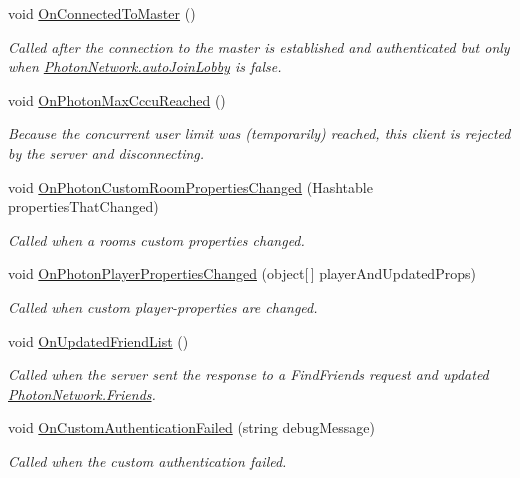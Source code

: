 \begin{DoxyCompactItemize}
void \hyperlink{interface_i_pun_callbacks_aee4c7c26520ae45019b605b054fa1ac0}{On\+Connected\+To\+Master} ()
\begin{DoxyCompactList}\small\item\em Called after the connection to the master is established and authenticated but only when \hyperlink{class_photon_network_ad534d4da7222bd8a6d8423cbd238d7f4}{Photon\+Network.\+auto\+Join\+Lobby} is false. \end{DoxyCompactList}\item 
void \hyperlink{interface_i_pun_callbacks_a445d24c62e4e3d8bbc2cc0d25853d43c}{On\+Photon\+Max\+Cccu\+Reached} ()
\begin{DoxyCompactList}\small\item\em Because the concurrent user limit was (temporarily) reached, this client is rejected by the server and disconnecting. \end{DoxyCompactList}\item 
void \hyperlink{interface_i_pun_callbacks_a3a210383eb25f1c6f509aaa23c792f6f}{On\+Photon\+Custom\+Room\+Properties\+Changed} (Hashtable properties\+That\+Changed)
\begin{DoxyCompactList}\small\item\em Called when a room\textquotesingle{}s custom properties changed. \end{DoxyCompactList}\item 
void \hyperlink{interface_i_pun_callbacks_aa6d84e9c68f93825fb3bf453d6f5ca1b}{On\+Photon\+Player\+Properties\+Changed} (object\mbox{[}$\,$\mbox{]} player\+And\+Updated\+Props)
\begin{DoxyCompactList}\small\item\em Called when custom player-\/properties are changed. \end{DoxyCompactList}\item 
void \hyperlink{interface_i_pun_callbacks_a5dd5d351e76698a0b6665064f6282baa}{On\+Updated\+Friend\+List} ()
\begin{DoxyCompactList}\small\item\em Called when the server sent the response to a Find\+Friends request and updated \hyperlink{class_photon_network_afd22fd553d52fdc63e975c32ea47514f}{Photon\+Network.\+Friends}. \end{DoxyCompactList}\item 
void \hyperlink{interface_i_pun_callbacks_a9b55ef4a99252e1a9a111a3f88b61e1d}{On\+Custom\+Authentication\+Failed} (string debug\+Message)
\begin{DoxyCompactList}\small\item\em Called when the custom authentication failed. \end{DoxyCompactList}\item 

\end{DoxyCompactItemize}
